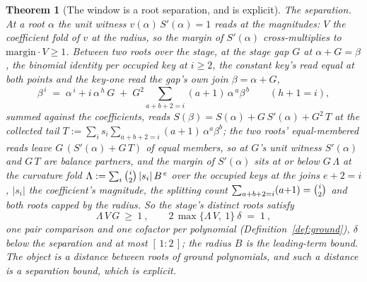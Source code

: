 \documentclass[11pt]{article}
\newtheorem{theorem}{Theorem}
\theoremstyle{definition}
\begin{document}
\begin{theorem}[The window is a root separation, and is explicit]
\emph{The separation.} At a root $\alpha$ the unit witness
$v(\alpha)\,S'(\alpha)=1$ reads at the magnitudes: $V$ the
coefficient
fold of $v$ at the radius, so the margin of $S'(\alpha)$
cross-multiplies to $\mathrm{margin}\cdot V\ge1$. Between two roots
over the stage, at the stage gap $G$ at $\alpha+G=\beta$, the binomial
identity per occupied key at $i\ge2$, the constant key's read
equal at both points and the key-one read the gap's own join
$\beta=\alpha+G$,
\[
\beta^{\,i}\;=\;\alpha^{\,i}+i\,\alpha^{\,h}\,G
\;+\;G^{2}\!\!\sum_{a+b+2=i}\!(a{+}1)\,\alpha^{\,a}\beta^{\,b}
\qquad(h+1=i) ,
\]
summed against the coefficients, reads
$S(\beta)=S(\alpha)+G\,S'(\alpha)+G^{2}\,T$ at the collected tail
$T:=\sum_is_i\sum_{a+b+2=i}(a{+}1)\,\alpha^{a}\beta^{b}$; the two
roots' equal-membered reads leave $G\,(S'(\alpha)+G\,T)$ of equal
members, so at $G$'s unit witness $S'(\alpha)$ and $G\,T$ are
balance partners, and the margin of $S'(\alpha)$ sits at or below
$G\,\Lambda$ at the \emph{curvature fold}
$\Lambda:=\sum_i\tbinom i2\,|s_i|\,B^{\,e}$ over the occupied
keys at the joins $e+2=i$, $|s_i|$ the coefficient's magnitude, the
splitting count $\sum_{a+b+2=i}(a{+}1)=\tbinom i2$ and both roots
capped by the radius. So the stage's distinct
roots satisfy
\[
\Lambda\,V\,G\ \ge\ 1\ ,
\qquad
2\,\max\{\Lambda\,V,\ 1\}\ \delta\;=\;1\ ,
\]
one pair comparison and one cofactor per polynomial
(Definition~\ref{def:ground}), $\delta$ below the separation and at
most $[\,1:2\,]$; the radius $B$ is the
\emph{leading-term bound}. The object is a distance between
roots of ground polynomials, and such a distance is a separation
bound, which is explicit.
\end{theorem}
\end{document}
